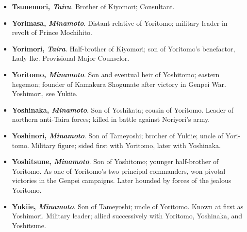 \documentclass{article}
\begin{document}
\begin{small}
\begin{itemize}[
            label=,
            leftmargin=0em,
            itemindent=-2em,
            nosep,
        ]
        \item \textbf{Tsunemori, \textit{Taira}}. Brother of Kiyomori; Consultant.

        \item \textbf{Yorimasa, \textit{Minamoto}}. Distant relative of Yoritomo; military leader in revolt of Prince Mochihito.

        \item \textbf{Yorimori, \textit{Taira}}. Half-brother of Kiyomori; son of Yoritomo’s benefactor, Lady Ike. Provisional Major Counselor.

        \item \textbf{Yoritomo, \textit{Minamoto}}. Son and eventual heir of Yoshitomo; eastern hegemon; founder of Kamakura Shogunate after victory in Genpei War. Yoshimori, see Yukiie.

        \item \textbf{Yoshinaka, \textit{Minamoto}}. Son of Yoshikata; cousin of Yoritomo. Leader of northern anti-Taira forces; killed in battle against Noriyori’s army.

        \item \textbf{Yoshinori, \textit{Minamoto}}. Son of Tameyoshi; brother of Yukiie; uncle of Yori-tomo. Military figure; sided first with Yoritomo, later with Yoshinaka.

        \item \textbf{Yoshitsune, \textit{Minamoto}}. Son of Yoshitomo; younger half-brother of Yoritomo. As one of Yoritomo’s two principal commanders, won pivotal victories in the Genpei campaigns. Later hounded by forces of the jealous Yoritomo.

        \item \textbf{Yukiie, \textit{Minamoto}}. Son of Tameyoshi; uncle of Yoritomo. Known at first as Yoshimori. Military leader; allied successively with Yoritomo, Yoshinaka, and Yoshitsune.

    \end{itemize}

\end{small}

\clearpage
\end{document}
